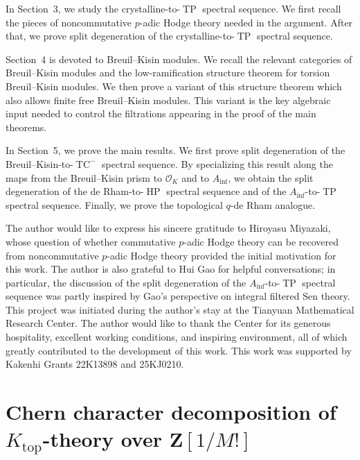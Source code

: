 \documentclass[11pt]{amsart}
\numberwithin{equation}{section}
\newcommand{\sO}{\mathcal{O}}
\numberwithin{equation}{section}
\newcommand{\Ainf}{A_{\operatorname{inf}}}
\newcommand{\TP}{\operatorname{TP}}
\newcommand{\TCn}{\operatorname{TC}^{-}}
\newcommand{\HP}{\operatorname{HP}}
\newcommand{\Ktop}{K_{\operatorname{top}}}
\begin{document}
In Section~3, we study the crystalline-to-$\TP$ spectral sequence.  We first recall the pieces of noncommutative $p$-adic Hodge theory needed in the argument. After that, we prove split
degeneration of the crystalline-to-$\TP$ spectral sequence.

Section~4 is devoted to Breuil--Kisin modules.  We recall the relevant categories of Breuil--Kisin modules and the low-ramification structure theorem for torsion Breuil--Kisin modules.  We then prove a variant of this structure theorem which also allows finite free Breuil--Kisin modules.  This variant is the key algebraic input needed to control the filtrations appearing in the proof of the main theorems.

In Section~5, we prove the main results. We first prove split degeneration of the Breuil--Kisin-to-$\TCn$ spectral sequence.  By specializing this result along the maps from the Breuil--Kisin prism to $\sO_K$ and to $\Ainf$, we obtain the split degeneration of the de Rham-to-$\HP$ spectral sequence and of the $\Ainf$-to-$\TP$ spectral sequence.  Finally, we prove the topological $q$-de Rham analogue.


\bigskip
{}

The author would like to express his sincere gratitude to Hiroyasu Miyazaki, whose question of whether commutative $p$-adic Hodge theory can be recovered from noncommutative $p$-adic Hodge theory provided the initial motivation for this work. The author is also grateful to Hui Gao for helpful conversations; in particular, the discussion of the split degeneration of the $\Ainf$-to-$\TP$ spectral sequence was partly inspired by Gao's perspective on integral filtered Sen theory. This project was initiated during the author's stay at the Tianyuan Mathematical Research Center. The author would like to thank the Center for its generous hospitality, excellent working conditions, and inspiring environment, all of which greatly contributed to the development of this work. This work was supported by Kakenhi Grants 22K13898 and 25KJ0210.

\section{\texorpdfstring{Chern character decomposition of $\Ktop$-theory over $\mathbf{Z}[1/M!]$}{Chern character decomposition of K-theory over Z[1/M!]}}
\end{document}
